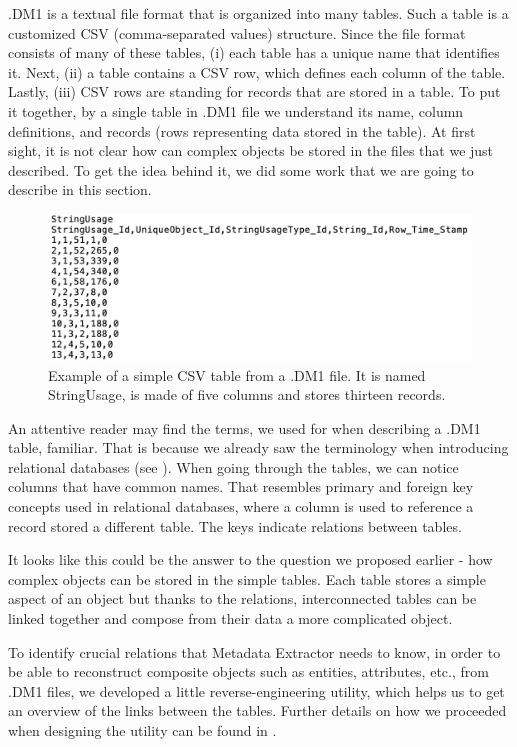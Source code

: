 .DM1 is a textual file format that is organized into many tables.
Such a table is a customized CSV (comma-separated values) structure. Since the file format consists of many of these tables, (i) each table has a unique name that identifies it. 
Next, (ii) a table contains a CSV row, which defines each column of the table. 
Lastly, (iii) CSV rows are standing for records that are stored in a table. 
To put it together, by a single table in .DM1 file we understand its name, column definitions, and records (rows representing data stored in the table).
At first sight, it is not clear how can complex objects be stored in the files that we just described. To get the idea behind it, we did some work that we are going to describe in this section. 

\begin{figure}[H]
	\centering
	\includegraphics[width=14cm]{../img/StringUsageTable}
	\caption[Table from .DM1 file]{Example of a simple CSV table from a .DM1 file. It is named StringUsage, is made of five columns and stores thirteen records.}
\end{figure}

An attentive reader may find the terms, we used for when describing a .DM1 table, familiar. 
That is because we already saw the terminology when introducing relational databases (see ). 
When going through the tables, we can notice columns that have common names.
That resembles primary and foreign key concepts used in relational databases, where a column is used to reference a record stored a different table. 
The keys indicate relations between tables.

It looks like this could be the answer to the question we proposed earlier - how complex objects can be stored in the simple tables. Each table stores a simple aspect of an object but thanks to the relations, interconnected tables can be linked together and compose from their data a more complicated object.

To identify crucial relations that Metadata Extractor needs to know, in order to be able to reconstruct composite objects such as entities, attributes, etc., from .DM1 files, we developed a little reverse-engineering utility, which helps us to get an overview of the links between the tables.
Further details on how we proceeded when designing the utility can be found in . 

